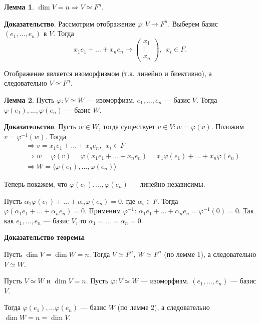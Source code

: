 \documentclass[a4paper, 12pt]{article}
\newcommand*\circled[1]{\tikz[baseline=(char.base)]{
        \node[shape=circle,draw,inner sep=1.5pt] (char) {#1};}}
\begin{document}
\textbf{Лемма 1}. $\dim V = n \Rightarrow V \simeq F^n$.

\textbf{Доказательство}. Рассмотрим отображение $\varphi: V \rightarrow F^n$. Выберем базис $(e_1, \ldots, e_n)$ в $V$. Тогда
\vspace{-2mm}
\[
x_1e_1 + \ldots + x_ne_n \mapsto
\begin{pmatrix}
x_1 \\
\vdots \\
x_n
\end{pmatrix},\ \ x_i \in F.
\]

Отображение является изоморфизмом (т.к. линейно и биективно), а следовательно $V \simeq F^n$.

\textbf{Лемма 2}. Пусть $\varphi: V \simeq W$ --- изоморфизм. $e_1, \ldots, e_n$ --- базис $V$. Тогда $\varphi(e_1), \ldots, \varphi(e_n)$ --- базис $W$.

\textbf{Доказательство}. Пусть $w \in W$, тогда существует $v \in V: w = \varphi(v)$. Положим $v = \varphi^{-1}(w)$. Тогда
\vspace{-3mm}
\begin{align*}
&\Rightarrow v = x_1e_1 + \ldots + x_ne_n,\ \ x_i \in F \\
&\Rightarrow w = \varphi(v) = \varphi(x_1e_1 + \ldots + x_ne_n) = x_1\varphi(e_1) + \ldots + x_n\varphi(e_n) \\
&\Rightarrow W = \langle \varphi(e_1), \ldots, \varphi(e_n) \rangle
\end{align*}

Теперь покажем, что $\varphi(e_1), \ldots, \varphi(e_n)$ --- линейно независимы.

Пусть $\alpha_1\varphi(e_1) + \ldots + \alpha_n\varphi(e_n) = 0$, где $\alpha_i \in F$. Тогда $\varphi(\alpha_1e_1 + \ldots + \alpha_ne_n) = 0$. Применим $\varphi^{-1}$: $\alpha_1e_1 + \ldots + \alpha_ne_n = \varphi^{-1}(0) = 0$. Так как $e_1, \ldots, e_n$ --- базис $V$, то $\alpha_1 = \ldots = \alpha_n = 0$.

\textbf{Доказательство теоремы}.

\circled{$\Leftarrow$} Пусть $\dim V = \dim W = n$. Тогда $V \simeq F^n$, $W \simeq F^n$ (по лемме 1), а следовательно $V \simeq W$.

\circled{$\Rightarrow$} Пусть $V \simeq W$ и $\dim V = n$. Пусть $\varphi: V \simeq W$ --- изоморфизм. $(e_1, \ldots, e_n)$ --- базис $V$.

Тогда $\varphi(e_1), \ldots \varphi(e_n)$ --- базис $W$ (по лемме 2), а следовательно $\dim W = n = \dim V$.
\end{document}

